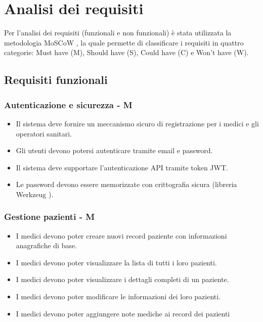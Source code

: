 \documentclass[12pt,a4paper,oneside]{report}
\begin{document}
\chapter{Analisi dei requisiti}
Per l'analisi dei requisiti (funzionali e non funzionali) è stata utilizzata la metodologia MoSCoW \cite{moscow}, la quale permette di classificare i requisiti in quattro categorie: Must have (M), Should have (S), Could have (C) e Won't have (W).

\section{Requisiti funzionali}

\subsection{Autenticazione e sicurezza - M}

\begin{itemize}
    \item Il sistema deve fornire un meccanismo sicuro di registrazione per i medici e gli operatori sanitari.
    \item Gli utenti devono potersi autenticare tramite email e password.
    \item Il sistema deve supportare l'autenticazione API tramite token JWT.
    \item Le password devono essere memorizzate con crittografia sicura (libreria Werkzeug \cite{werkzeug}).
\end{itemize}

\subsection{Gestione pazienti - M}

\begin{itemize}
    \item I medici devono poter creare nuovi record paziente con informazioni anagrafiche di base.
    \item I medici devono poter visualizzare la lista di tutti i loro pazienti.
    \item I medici devono poter visualizzare i dettagli completi di un paziente.
    \item I medici devono poter modificare le informazioni dei loro pazienti.
    \item I medici devono poter aggiungere note mediche ai record dei pazienti
\end{itemize}
\end{document}
